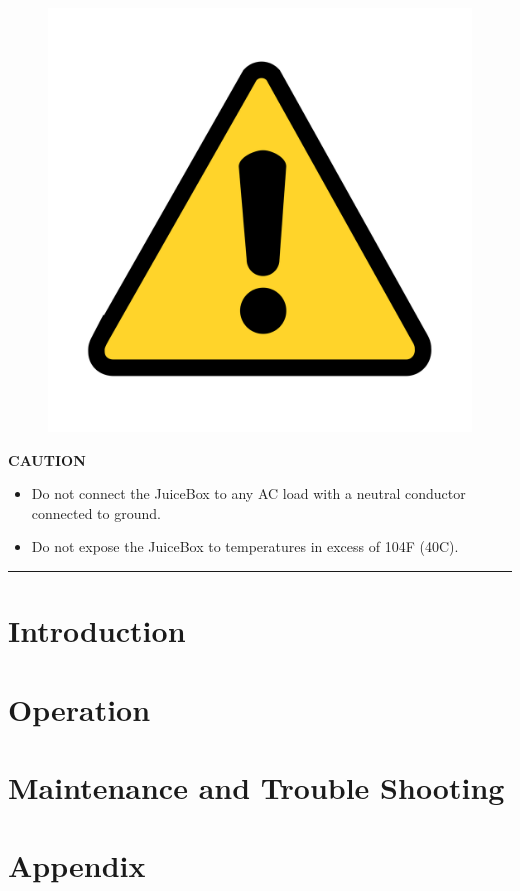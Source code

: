 \documentclass[10pt]{article}
\begin{document}
\begin{figure}
    \includegraphics[width=.75in]{warning_y}
\end{figure}

\vspace{5mm}
\noindent   
\Large{\textbf{CAUTION}} \\
\begin{large}                                        
	\begin{itemize}
		\item{Do not connect the JuiceBox to any AC load with a neutral conductor connected to ground.}
		\item{Do not expose the JuiceBox to temperatures in excess of 104F (40C).}
	\end{itemize}
\end{large}
\hrule


\newpage
\tableofcontents

\newpage
{} 					%
\setcounter{page}{1} 					%

\newpage
\section{\huge{Introduction}}

 
\newpage
\section{\huge{Operation}}


\newpage
\section{\huge{Maintenance and Trouble Shooting}}



\newpage
\section{\huge{Appendix}}

\end{document}
